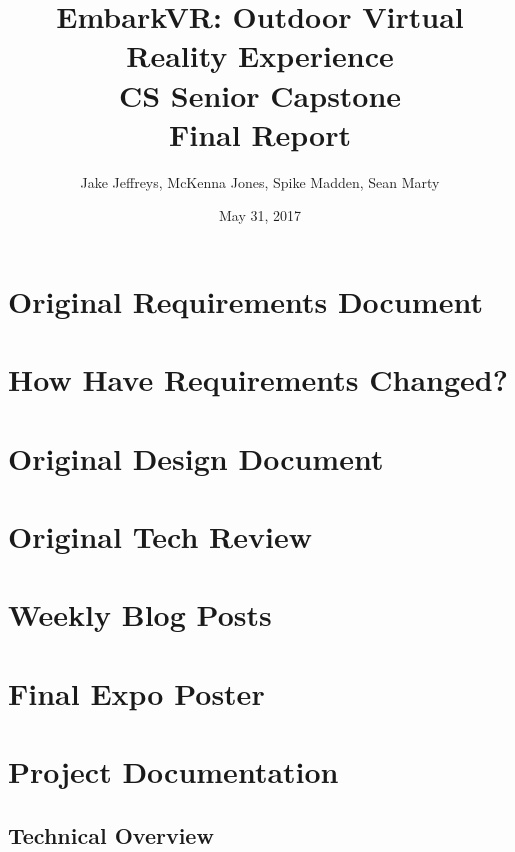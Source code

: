 \documentclass[10pt,journal,compsoc,onecolumn, draftclsnofoot]{IEEEtran}
\title{
EmbarkVR: Outdoor Virtual Reality Experience \\
CS Senior Capstone \\
Final Report\\
\vspace{1mm}
}
\author{Jake Jeffreys, McKenna Jones, Spike Madden, Sean Marty}
\date{May 31, 2017}
\begin{document}
\begin{titlepage}
\maketitle
\vspace{1mm}
\begin{abstract}

\end{abstract}
\vspace{1cm}

\end{titlepage}
\clearpage

\section{Original Requirements Document}

\section{How Have Requirements Changed?}

\section{Original Design Document}


\section{Original Tech Review}


\section{Weekly Blog Posts}

\section{Final Expo Poster}

\section{Project Documentation}
\subsection{Technical Overview}
\end{document}
